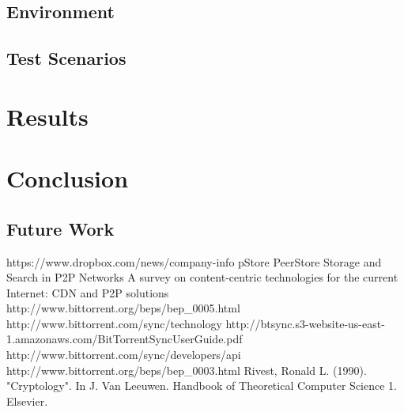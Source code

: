 \documentclass[12pt]{report}
\begin{document}

\section{Environment}


\section{Test Scenarios}



\chapter{Results}

\chapter{Conclusion}

\section{Future Work}


\begin{thebibliography}{1}

 https://www.dropbox.com/news/company-info
 pStore
 PeerStore
 Storage and Search in P2P Networks
 A survey on content-centric technologies for the current Internet: CDN and P2P solutions
 http://www.bittorrent.org/beps/bep\_0005.html
 http://www.bittorrent.com/sync/technology
 http://btsync.s3-website-us-east-1.amazonaws.com/BitTorrentSyncUserGuide.pdf
 http://www.bittorrent.com/sync/developers/api
 http://www.bittorrent.org/beps/bep\_0003.html
 Rivest, Ronald L. (1990). "Cryptology". In J. Van Leeuwen. Handbook of Theoretical Computer Science 1. Elsevier.

\end{thebibliography}
\end{document}
